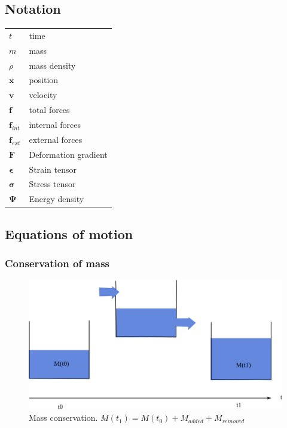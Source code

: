 \documentclass[11pt, oneside, a4paper]{memoir}
\begin{document}
\subsection{Notation}

\begin{table}[!h]
\begin{tabular}{ll}
$t$ & time \\
$m$ &  mass \\
$\rho$ & mass density \\
$\mathbf{x}$ & position \\
$\mathbf{v}$ & velocity \\
$\mathbf{f}$ & total forces \\
$\mathbf{f}_{int}$ & internal forces \\
$\mathbf{f}_{ext}$ & external forces \\
$\mathbf{F}$ & Deformation gradient \\
$\mathbf{\epsilon}$ & Strain tensor \\
$\mathbf{\sigma}$ & Stress tensor \\
$\mathbf{\Psi}$ & Energy density
\end{tabular}
\end{table}

\subsection{Equations of motion}

\subsubsection{Conservation of mass}

\begin{figure}[!ht]
\centering
\includegraphics[scale=0.5]{images/continuum_mechanics/massConservation.png}
\caption{\label{fig:massConservation} Mass conservation. $M(t_{1}) = M(t_{0}) + M_{added} + M_{removed}$}
\end{figure}
\end{document}
